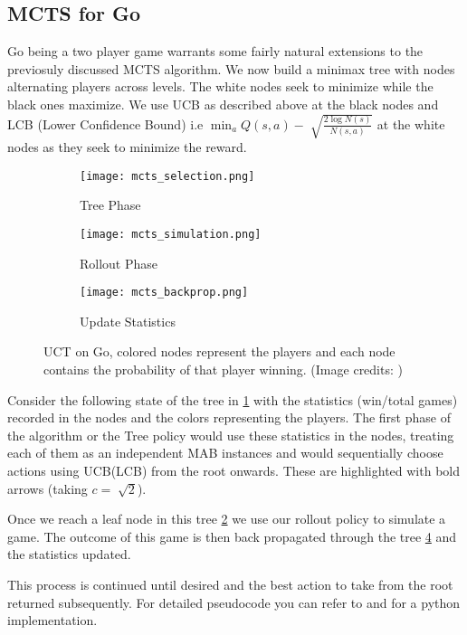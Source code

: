 \documentclass{article}
\begin{document}
\subsection{MCTS for Go} \label{Go}
Go being a two player game  warrants some fairly natural extensions to the previosuly discussed MCTS algorithm. We now build a minimax tree with nodes alternating players across levels. The white nodes seek to minimize while the black ones maximize. We use UCB as described above at the black nodes and LCB (Lower Confidence Bound) i.e $\min_a Q(s,a)-\sqrt[]{\frac{2\log N(s)}{N(s,a)}}$ at the white nodes as they seek to minimize the reward.\par
\begin{figure}
\begin{subfigure}{.3\textwidth}
\texttt{[image: mcts\_selection.png]}
\caption{Tree Phase}
\label{tree-pol}
\end{subfigure}
\hfill
\begin{subfigure}{.3\textwidth}
\texttt{[image: mcts\_simulation.png]}
\caption{Rollout Phase}
\label{roll-pol}
\end{subfigure}
\hfill
\begin{subfigure}{.3\textwidth}
\texttt{[image: mcts\_backprop.png]}
\caption{Update Statistics}
\label{back-prop}
\end{subfigure}
\caption{UCT on Go, colored nodes represent the players and each node contains the probability of that player winning. (Image credits: \cite{blog})}
\end{figure}
Consider the following state of the tree in \ref{tree-pol} with the statistics (win/total games) recorded in the nodes and the colors representing the players. The first phase of the algorithm or the Tree policy would use these statistics in the nodes, treating each of them as an independent MAB instances and would sequentially choose actions using UCB(LCB) from the root onwards. These are highlighted with bold arrows (taking $c=\sqrt[]{2}$). \par
Once we reach a leaf node in this tree \ref{roll-pol} we use our rollout policy to simulate a game. The outcome of this game is then back propagated through the tree \ref{back-prop} and the statistics updated. 

This process is continued until desired and the best action to take from the root returned subsequently. For detailed pseudocode you can refer to \cite{mcts} and \cite{blog} for a python implementation.
\end{document}
